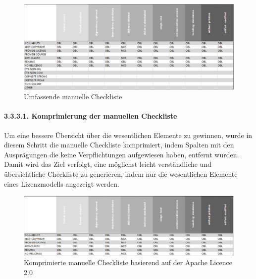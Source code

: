 \begin{figure}[p]
    \centering
    \includegraphics[angle=90, scale=1.0]{Bilder/Manuelle Checkliste.png}
    \caption{Umfassende manuelle Checkliste}
\end{figure}

\newpage
\paragraph{3.3.3.1. Komprimierung der manuellen Checkliste}

Um eine bessere Übersicht über die wesentlichen Elemente zu gewinnen, wurde in diesem Schritt die manuelle Checkliste komprimiert, indem Spalten mit den Ausprägungen die keine Verpflichtungen aufgewiesen haben, entfernt wurden. Damit wird das Ziel verfolgt, eine möglichst leicht verständliche und übersichtliche Checkliste zu generieren, indem nur die wesentlichen Elemente eines Lizenzmodells angezeigt werden. 

\begin{figure}[h]
    \centering
    \includegraphics[scale=0.6]{Bilder/Manuelle Checkliste_komprimiert.png}
    \caption{Komprimierte manuelle Checkliste basierend auf der Apache Licence 2.0}
\end{figure}





